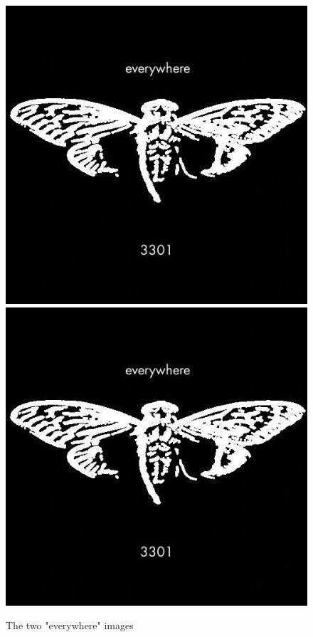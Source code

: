 \documentclass{article}
\begin{document}
\begin{figure}[h]
	\centering
	
	\includegraphics[scale=0.3]{agrippa}
	\includegraphics[scale=0.3]{brittanica}
	
	\caption{The two "everywhere" images}
\end{figure}
\end{document}
